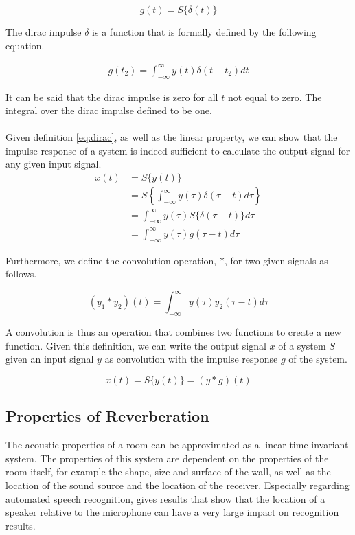 \[g(t) = S\{\delta(t)\}\]

The dirac impulse $\delta$ is a function that is formally defined by the following equation. 

\begin{align}
g(t_2) = \int_{-\infty}^{\infty} y(t)\delta(t - t_2) dt \label{eq:dirac} 
\end{align}

It can be said that the dirac impulse is zero for all $t$ not equal to zero. The integral over the dirac impulse defined to be one. 
\\ \\
Given definition \ref{eq:dirac}, as well as the linear property, we can show that the impulse response of a system is indeed sufficient to calculate the output signal for any given input signal. 
\begin{align*}
x(t) &= S\{y(t)\} \\
	 &= S\left\{\int_{-\infty}^{\infty} y(\tau)\delta(\tau - t) d\tau \right\} \\
	 &= \int_{-\infty}^{\infty} y(\tau)S\{\delta(\tau - t)\} d\tau \\
	 &= \int_{-\infty}^{\infty} y(\tau)g(\tau - t) d\tau
\end{align*}

Furthermore, we define the convolution operation, $*$, for two given signals as follows.

\[
 (y_1 * y_2)(t) = \int_{-\infty}^{\infty} y(\tau)y_2(\tau - t) d\tau \tag{convolution}
\]

A convolution is thus an operation that combines two functions to create a new function. Given this definition, we can write the output signal $x$ of a system $S$ given an input signal $y$ as convolution with the impulse response $g$ of the system. 

\[
x(t) = S\{y(t)\} = (y * g)(t)
\]

\subsection{Properties of Reverberation}

The acoustic properties of a room can be approximated as a linear time invariant system. The properties of this system are dependent on the properties of the room itself, for example the shape, size and surface of the wall, as well as the location of the sound source and the location of the receiver. Especially regarding automated speech recognition, \cite{ritter2016training} gives results that show that the location of a speaker relative to the microphone can have a very large impact on recognition results.

